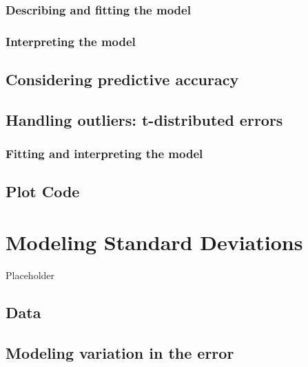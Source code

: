 \documentclass[
]{book}
\begin{document}
\hypertarget{describing-and-fitting-the-model}{%
\subsection{Describing and fitting the model}\label{describing-and-fitting-the-model}}

\hypertarget{interpreting-the-model-8}{%
\subsection{Interpreting the model}\label{interpreting-the-model-8}}

\hypertarget{considering-predictive-accuracy}{%
\section{Considering predictive accuracy}\label{considering-predictive-accuracy}}

\hypertarget{handling-outliers-t-distributed-errors}{%
\section{Handling outliers: t-distributed errors}\label{handling-outliers-t-distributed-errors}}

\hypertarget{fitting-and-interpreting-the-model}{%
\subsection{Fitting and interpreting the model}\label{fitting-and-interpreting-the-model}}

\hypertarget{plot-code-8}{%
\section{Plot Code}\label{plot-code-8}}

\hypertarget{modeling-standard-deviations}{%
\chapter{Modeling Standard Deviations}\label{modeling-standard-deviations}}

Placeholder

\hypertarget{data}{%
\section{Data}\label{data}}

\hypertarget{modeling-variation-in-the-error}{%
\section{Modeling variation in the error}\label{modeling-variation-in-the-error}}
\end{document}
